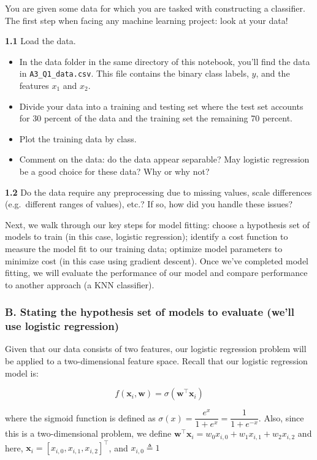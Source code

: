 \documentclass[
  letterpaper,
  DIV=11,
  numbers=noendperiod]{scrartcl}
\providecommand{\tightlist}{%
  \setlength{\itemsep}{0pt}\setlength{\parskip}{0pt}}\usepackage{longtable,booktabs,array}
\begin{document}
You are given some data for which you are tasked with constructing a
classifier. The first step when facing any machine learning project:
look at your data!

\textbf{1.1} Load the data.

\begin{itemize}
\tightlist
\item
  In the data folder in the same directory of this notebook, you'll find
  the data in \texttt{A3\_Q1\_data.csv}. This file contains the binary
  class labels, \(y\), and the features \(x_1\) and \(x_2\).
\item
  Divide your data into a training and testing set where the test set
  accounts for 30 percent of the data and the training set the remaining
  70 percent.\\
\item
  Plot the training data by class.
\item
  Comment on the data: do the data appear separable? May logistic
  regression be a good choice for these data? Why or why not?
\end{itemize}

\textbf{1.2} Do the data require any preprocessing due to missing
values, scale differences (e.g.~different ranges of values), etc.? If
so, how did you handle these issues?

Next, we walk through our key steps for model fitting: choose a
hypothesis set of models to train (in this case, logistic regression);
identify a cost function to measure the model fit to our training data;
optimize model parameters to minimize cost (in this case using gradient
descent). Once we've completed model fitting, we will evaluate the
performance of our model and compare performance to another approach (a
KNN classifier).

\subsubsection{B. Stating the hypothesis set of models to evaluate
(we'll use logistic
regression)}\label{b.-stating-the-hypothesis-set-of-models-to-evaluate-well-use-logistic-regression}

Given that our data consists of two features, our logistic regression
problem will be applied to a two-dimensional feature space. Recall that
our logistic regression model is:

\[f(\mathbf{x}_i,\mathbf{w})=\sigma(\mathbf{w}^{\top} \mathbf{x}_i)\]

where the sigmoid function is defined as
\(\sigma(x) = \dfrac{e^x}{1+e^{x}}= \dfrac{1}{1+e^{-x}}\). Also, since
this is a two-dimensional problem, we define
\(\mathbf{w}^{\top} \mathbf{x}_i = w_0 x_{i,0} + w_1 x_{i,1} + w_2 x_{i,2}\)
and here, \(\mathbf{x}_i=[x_{i,0}, x_{i,1}, x_{i,2}]^{\top}\), and
\(x_{i,0} \triangleq 1\)
\end{document}
